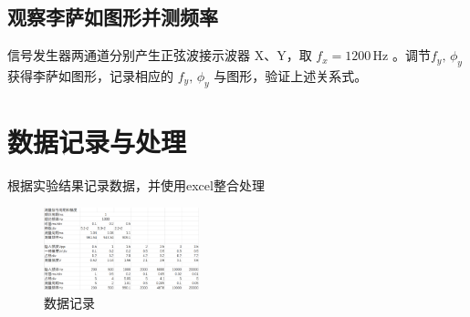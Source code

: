 \documentclass[12pt,a4paper]{article}
\begin{document}
	\subsection{观察李萨如图形并测频率}
	信号发生器两通道分别产生正弦波接示波器 X、Y，取 $f_x=1200\,\mathrm{Hz}$ 。调节$f_y,\, \phi_y$获得李萨如图形，记录相应的 $f_y,\, \phi_y$ 与图形，验证上述关系式。

	
	\section{数据记录与处理}
	\setcounter{section}{6}
	\setcounter{subsection}{0}
	根据实验结果记录数据，并使用excel整合处理
		\begin{figure}[H]
		\centering
		\includegraphics[width=0.40\textwidth]{数据.png}
		\caption{数据记录}
		\label{fig:chart1}
		\end{figure}
\end{document}
